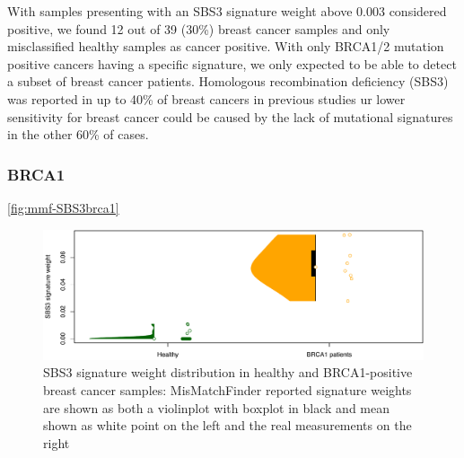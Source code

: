With samples presenting with an SBS3 signature weight above 0.003 considered positive, we found 12 out of 39 (30\%) breast cancer samples and only misclassified  healthy samples as cancer positive. With only BRCA1/2 mutation positive cancers having a specific signature, we only expected to be able to detect a subset of breast cancer patients. Homologous recombination deficiency (SBS3) was reported in up to 40\% of breast cancers in previous studies \cite{AkashiTanaka2015}ur lower sensitivity for breast cancer could be caused by the lack of mutational signatures in the other 60\% of cases.

\subsubsection{BRCA1}
\label{mmf-sec:tumourDetectionBRCA1}

\autoref{fig:mmf-SBS3brca1} 

\begin{figure}[ht]
\centering
\includegraphics[width=.99\linewidth]{Figures/MisMatchFinder/brca1_sbs3.pdf}
\caption[SBS3 signature weight distribution in healthy and BRCA1-positive breast cancer samples]{SBS3 signature weight distribution in healthy and BRCA1-positive breast cancer samples: MisMatchFinder reported signature weights are shown as both a violinplot with boxplot in black and mean shown as white point on the left and the real measurements on the right}\label{fig:mmf-SBS3brca1}
\end{figure}



